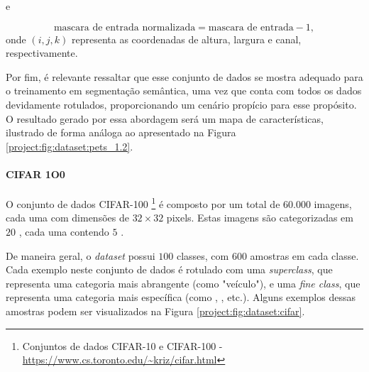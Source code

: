 e

\begin{equation}
    \label{project:eq:dataset:pets_2}
    \text{mascara de entrada normalizada} = \text{mascara de entrada} - 1,
\end{equation}
onde $(i,j,k)$ representa as coordenadas de altura, largura e canal, respectivamente.

Por fim, é relevante ressaltar que esse conjunto de dados se mostra adequado para o treinamento em segmentação semântica, uma vez que conta com todos os dados devidamente rotulados, proporcionando um cenário propício para esse propósito. O resultado gerado por essa abordagem será um mapa de características, ilustrado de forma análoga ao apresentado na Figura \ref{project:fig:dataset:pets_1.2}.

\paragraph{CIFAR 1O0}
\label{project:dataset:cifar}
O conjunto de dados CIFAR-100 \footnote{Conjuntos de dados CIFAR-10 e CIFAR-100 - \url{https://www.cs.toronto.edu/~kriz/cifar.html}} \citep{Krizhevsky2014TheDataset} é composto por um total de $60.000$ imagens, cada uma com dimensões de $32 \times 32$ pixels. Estas imagens são categorizadas em $20$ , cada uma contendo $5$ .

De maneira geral, o \textit{dataset} possui $100$ classes, com $600$ amostras em cada classe. Cada exemplo neste conjunto de dados é rotulado com uma \textit{superclass}, que representa uma categoria mais abrangente (como "veículo"), e uma \textit{fine class}, que representa uma categoria mais específica (como , , etc.). Alguns exemplos dessas amostras podem ser visualizados na Figura \ref{project:fig:dataset:cifar}.

